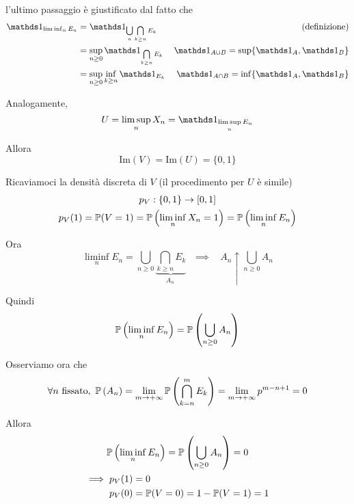 \begin{enumerate}
l'ultimo passaggio è giustificato dal fatto che
\begin{align*}
\Ind_{\liminf _{n} E_{n}} & =\Ind_{\bigcup\limits _{n}\bigcap\limits _{k\geq n} E_{k}} & \text{(definizione)}\\
 & =\sup\limits _{n\geq 0}\Ind_{\bigcap\limits _{k\geq n} E_{k}} & \Ind_{A\cup B} =\sup \{\Ind_{A} ,\Ind_{B}\}\\
 & =\sup _{n\geq 0}\inf_{k\geq n}\Ind_{E_{k}} & \Ind_{A\cap B} =\inf\{\Ind_{A} ,\Ind_{B}\}
\end{align*}

Analogamente,\begin{equation*}
U=\limsup _{n} X_{n} =\Ind_{\limsup\limits _{n} E_{n}}
\end{equation*}

Allora
\begin{equation*}
\mathrm{Im}( V) =\mathrm{Im}( U) =\{0,1\}
\end{equation*}

Ricaviamoci la densità discreta di $V$ (il procedimento per $U$ è simile)\begin{gather*}
p_{V} :\{0,1\}\rightarrow [ 0,1]\\
p_{V}( 1) =\mathbb{P}( V=1) =\mathbb{P}\left(\liminf _{n} X_{n} =1\right) =\mathbb{P}\left(\liminf _{n} E_{n}\right)
\end{gather*}

Ora
\begin{equation*}
\liminf _{n} E_{n} =\bigcup _{n\geq 0}\underbrace{\bigcap\limits _{k\geq n} E_{k}}_{A_{n} \ } \ \ \ \implies \ \ \ \ A_{n} \uparrow \bigcup _{n\geq 0} A_{n}
\end{equation*}

Quindi
\begin{equation*}
\mathbb{P}\left(\liminf _{n} E_{n}\right) =\mathbb{P}\left(\bigcup _{n\geq 0} A_{n}\right)
\end{equation*}

Osserviamo ora che
\begin{equation*}
\forall n\ \text{fissato} ,\ \PP\left( A_{n}\right) =\lim _{m\rightarrow +\infty }\PP\left(\bigcap\limits _{k=n}^{m} E_{k}\right) =\lim _{m\rightarrow +\infty } p^{m-n+1} =0
\end{equation*}

Allora
\begin{gather*}
\mathbb{P}\left(\liminf _{n} E_{n}\right) =\mathbb{P}\left(\bigcup _{n\geq 0} A_{n}\right) =0\\
\begin{aligned}
\implies p_{V}( 1) & =0\\
p_{V}( 0) & =\mathbb{P}( V=0) =1-\mathbb{P}( V=1) =1
\end{aligned}
\end{gather*}


\end{enumerate}
